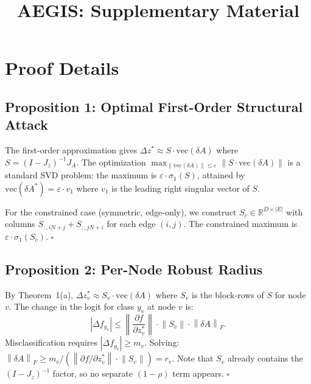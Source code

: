 \documentclass[conference]{IEEEtran}
\newcommand{\R}{\mathbb{R}}
\newcommand{\norm}[1]{\left\|#1\right\|}
\newcommand{\zstar}{z^{*}}
\begin{document}
\title{AEGIS: Supplementary Material}
\maketitle

\appendix

\section{Proof Details}
\label{app:proofs}

\subsection{Proposition 1: Optimal First-Order Structural Attack}

The first-order approximation gives $\Delta \zstar \approx S \cdot \mathrm{vec}(\delta A)$ where $S = (I - J_z)^{-1} J_A$. The optimization $\max_{\norm{\mathrm{vec}(\delta A)} \leq \varepsilon} \norm{S \cdot \mathrm{vec}(\delta A)}$ is a standard SVD problem: the maximum is $\varepsilon \cdot \sigma_1(S)$, attained by $\mathrm{vec}(\delta A^*) = \varepsilon \cdot v_1$ where $v_1$ is the leading right singular vector of $S$.

For the constrained case (symmetric, edge-only), we construct $S_c \in \R^{D \times |E|}$ with columns $S_{:,iN+j} + S_{:,jN+i}$ for each edge $(i,j)$. The constrained maximum is $\varepsilon \cdot \sigma_1(S_c)$. $\square$

\subsection{Proposition 2: Per-Node Robust Radius}

By Theorem~1(a), $\Delta \zstar_v \approx S_v \cdot \mathrm{vec}(\delta A)$ where $S_v$ is the block-rows of $S$ for node $v$. The change in the logit for class $y_v$ at node $v$ is:
\begin{equation}
|\Delta f_{y_v}| \leq \norm{\frac{\partial f}{\partial \zstar_v}} \cdot \norm{S_v} \cdot \norm{\delta A}_F.
\end{equation}
Misclassification requires $|\Delta f_{y_v}| \geq m_v$. Solving: $\norm{\delta A}_F \geq m_v / (\norm{\partial f / \partial \zstar_v} \cdot \norm{S_v}) = r_v$. Note that $S_v$ already contains the $(I - J_z)^{-1}$ factor, so no separate $(1-\rho)$ term appears. $\square$
\end{document}
